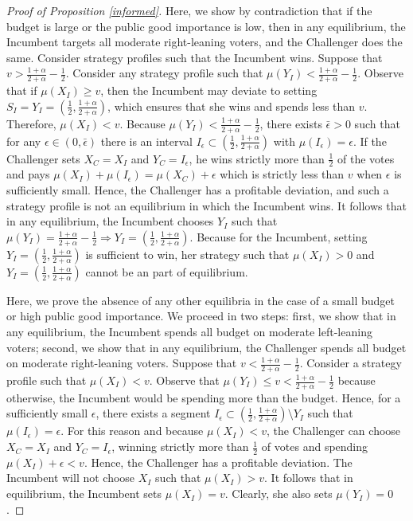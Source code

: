 \documentclass[12pt,english]{article}
\begin{document}
\begin{proof}[Proof of Proposition \ref{informed}]
Here, we show by contradiction that if the budget is large or the public good importance is low, then in any equilibrium, the Incumbent targets all moderate right-leaning voters, and the Challenger does the same. 
Consider strategy profiles such that the Incumbent wins. Suppose  that $v >   \frac{1 + \alpha}{2 + \alpha} -\frac{1}{2}  $. Consider any strategy profile such that $\mu(Y_I) < \frac{1 + \alpha}{2 + \alpha} - \frac{1}{2}$. Observe that if $\mu(X_I) \geq v$, then the Incumbent may deviate to setting $S_I = Y_I = (\frac{1}{2},\frac{1 + \alpha}{2 + \alpha})$, which ensures that she wins and spends less than $v$. Therefore, $\mu(X_I) < v$. Because  $\mu(Y_I) <  \frac{1 + \alpha}{2 + \alpha} - \frac{1}{2}$, there exists $ \bar \epsilon >0$ such that for any $\epsilon \in (0, \bar \epsilon)$ there is an interval $I_\epsilon \subset (\frac{1}{2},\frac{1 + \alpha}{2 + \alpha})$ with $\mu(I_\epsilon)  = \epsilon$. If the Challenger sets $X_C = X_I$ and $Y_C = I_\epsilon$, he wins strictly more than $\frac{1}{2}$ of the votes and pays $\mu(X_I) + \mu(I_\epsilon) = \mu(X_C) + \epsilon $ which is strictly less than $v$ when $\epsilon$ is sufficiently small. Hence, the Challenger has a profitable deviation, and such a strategy profile is not an equilibrium in which the Incumbent wins.  It follows that in any equilibrium, the Incumbent chooses $Y_I$ such that $\mu(Y_I) =   \frac{1 + \alpha}{2 + \alpha} - \frac{1}{2} \Rightarrow Y_I = (\frac{1}{2},  \frac{1 + \alpha}{2 + \alpha} )$. Because for the Incumbent, setting $Y_I = (\frac{1}{2},  \frac{1 + \alpha}{2 + \alpha} )$ is sufficient to win, her strategy such that $\mu(X_I) > 0 $ and $Y_I = (\frac{1}{2},  \frac{1 + \alpha}{2 + \alpha} )$ cannot be an part of equilibrium.

Here, we prove the absence of any other equilibria in the case of a small budget or high public good importance. We proceed in two steps: first, we show that in any equilibrium, the Incumbent spends all budget on moderate left-leaning voters; second, we show that in any equilibrium, the Challenger spends all budget on moderate right-leaning voters.
Suppose that $v < \frac{1 + \alpha}{2 + \alpha} -  \frac{1}{2} $. Consider a strategy profile such that $\mu(X_I) < v$. Observe that $\mu(Y_I) \leq v < \frac{1 + \alpha}{2 + \alpha} -  \frac{1}{2} $ because otherwise, the Incumbent would be spending more than the budget. Hence, for a sufficiently small $\epsilon$, there exists a segment $I_\epsilon \subset (\frac{1}{2},\frac{1 + \alpha}{2 + \alpha}) \setminus Y_I$ such that $\mu(I_\epsilon) = \epsilon$. For this reason and because $\mu(X_I) < v$, the Challenger can choose $X_C = X_I$ and $Y_C = I_\epsilon$, winning strictly more than $\frac{1}{2}$ of votes and spending $\mu(X_I) + \epsilon < v$. Hence, the Challenger has a profitable deviation. 
The Incumbent will not choose $X_I$ such that $\mu(X_I) > v$. It follows that in equilibrium, the Incumbent sets $\mu(X_I) = v$. Clearly, she also sets $\mu(Y_I) = 0$. 


\end{proof}
\end{document}
